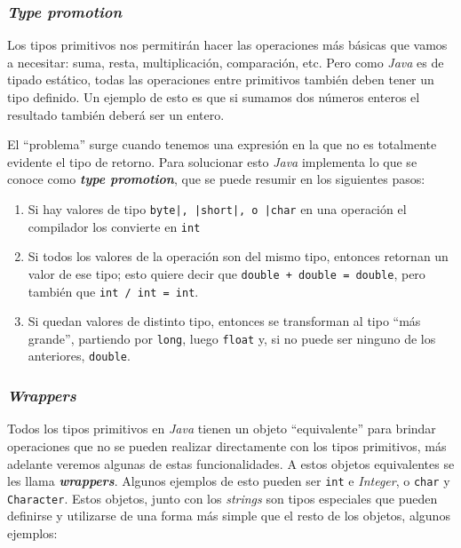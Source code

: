   \subsubsection{\textit{Type promotion}}
    Los tipos primitivos nos permitirán hacer las operaciones más básicas que vamos a necesitar: suma,
    resta, multiplicación, comparación, etc.
    Pero como \textit{Java} es de tipado estático, todas las operaciones entre primitivos también
    deben tener un tipo definido.
    Un ejemplo de esto es que si sumamos dos números enteros el resultado también deberá ser un 
    entero.

    El \enquote{problema} surge cuando tenemos una expresión en la que no es totalmente evidente el 
    tipo de retorno.
    Para solucionar esto \textit{Java} implementa lo que se conoce como \textbf{\textit{type 
    promotion}}, que se puede resumir en los siguientes pasos:
    \begin{enumerate}
      \item Si hay valores de tipo \texttt{byte|, |short|, o |char} en una 
        operación el compilador los convierte en \texttt{int}
      \item Si todos los valores de la operación son del mismo tipo, entonces retornan un valor de ese 
        tipo; esto quiere decir que \texttt{double + double = double}, pero también que 
        \texttt{int / int = int}.
      \item Si quedan valores de distinto tipo, entonces se transforman al tipo \enquote{más grande}, 
        partiendo por \texttt{long}, luego \texttt{float} y, si no puede ser 
        ninguno de los anteriores, \texttt{double}.
    \end{enumerate}

  \subsubsection{\textit{Wrappers}}
    Todos los tipos primitivos en \textit{Java} tienen un objeto \enquote{equivalente} 
    para brindar operaciones que no se pueden realizar directamente con los tipos 
    primitivos, más adelante veremos algunas de estas funcionalidades.
    A estos objetos equivalentes se les llama \textbf{\textit{wrappers}}.
    Algunos ejemplos de esto pueden ser \texttt{int} e \textit{Integer}, o 
    \texttt{char} y \texttt{Character}.
    Estos objetos, junto con los \textit{strings} son tipos especiales que pueden definirse y 
    utilizarse de una forma más simple que el resto de los objetos, algunos ejemplos:
    
